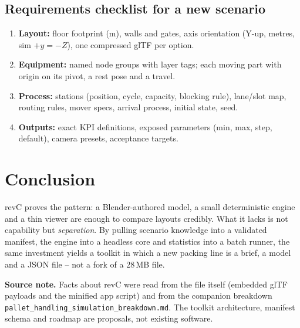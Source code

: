 \documentclass[11pt,a4paper]{article}
\begin{document}
\subsection{Requirements checklist for a new scenario}
\begin{enumerate}[leftmargin=*,itemsep=2pt]
  \item \textbf{Layout:} floor footprint (m), walls and gates, axis orientation (Y-up, metres, sim $+y=-Z$), one compressed glTF per option.
  \item \textbf{Equipment:} named node groups with layer tags; each moving part with origin on its pivot, a rest pose and a travel.
  \item \textbf{Process:} stations (position, cycle, capacity, blocking rule), lane/slot map, routing rules, mover specs, arrival process, initial state, seed.
  \item \textbf{Outputs:} exact KPI definitions, exposed parameters (min, max, step, default), camera presets, acceptance targets.
\end{enumerate}

\section{Conclusion}
revC proves the pattern: a Blender-authored model, a small deterministic engine and a thin viewer are enough to compare
layouts credibly. What it lacks is not capability but \emph{separation}. By pulling scenario knowledge into a validated manifest, the engine into a headless core and
statistics into a batch runner, the same investment yields a toolkit in which a new packing line is a brief, a model and a JSON file -- not a fork of a 28\,MB file.

\vspace{4mm}
\noindent\textbf{Source note.} Facts about revC were read from the file itself (embedded glTF payloads and the minified app script) and from the
companion breakdown \texttt{pallet\_handling\_simulation\_breakdown.md}. The toolkit architecture, manifest schema and roadmap are proposals, not existing software.
\end{document}
